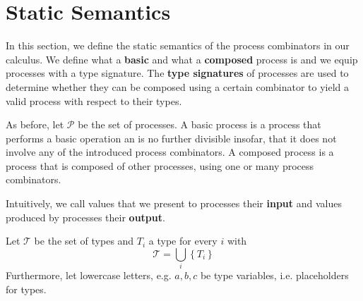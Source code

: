 


\section{Static Semantics}
\label{chp:static_semantics}
In this section, we define the static semantics of the process combinators in our calculus. We define what a \textbf{basic} and what a \textbf{composed} process is and we equip processes with a type signature. The \textbf{type signatures} of processes are used to determine whether they can be composed using a certain combinator to yield a valid process with respect to their types.

As before, let $\mathcal{P}$ be the set of processes. A basic process is a process that performs a basic operation an is no further divisible insofar, that it does not involve any of the introduced process combinators. A composed process is a process that is composed of other processes, using one or many process combinators.

Intuitively, we call values that we present to processes their \textbf{input} and values produced by processes their \textbf{output}.

\begin{definition}
Let $\mathcal{T}$ be the set of types and $T_i$ a type for every $i$ with
\begin{equation*}
  \mathcal{T} = \bigcup_i \left\{ T_i \right\}
\end{equation*}
Furthermore, let lowercase letters, e.g. $a, b, c$ be type variables, i.e. placeholders for types.

\hfill\qedsymbol
\end{definition}

